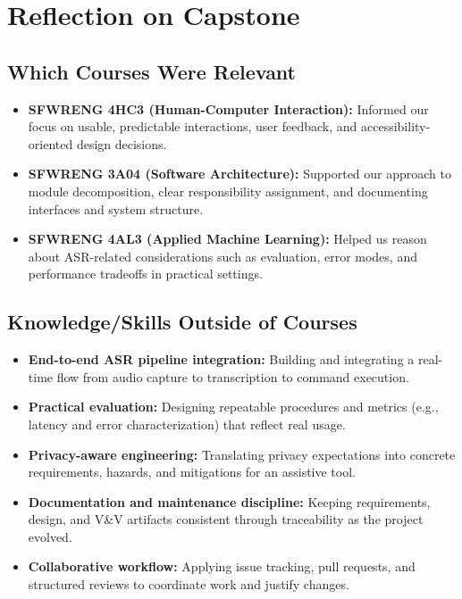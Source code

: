 \documentclass{article}
\begin{document}
\section{Reflection on Capstone}

\subsection{Which Courses Were Relevant}

\begin{itemize}
  \item \textbf{SFWRENG 4HC3 (Human-Computer Interaction):} Informed our focus on
  usable, predictable interactions, user feedback, and accessibility-oriented
  design decisions.
  \item \textbf{SFWRENG 3A04 (Software Architecture):} Supported our approach to
  module decomposition, clear responsibility assignment, and documenting
  interfaces and system structure.
  \item \textbf{SFWRENG 4AL3 (Applied Machine Learning):} Helped us reason about
  ASR-related considerations such as evaluation, error modes, and performance
  tradeoffs in practical settings.
\end{itemize}

\subsection{Knowledge/Skills Outside of Courses}

\begin{itemize}
  \item \textbf{End-to-end ASR pipeline integration:} Building and integrating a
  real-time flow from audio capture to transcription to command execution.
  \item \textbf{Practical evaluation:} Designing repeatable procedures and
  metrics (e.g., latency and error characterization) that reflect real usage.
  \item \textbf{Privacy-aware engineering:} Translating privacy expectations into
  concrete requirements, hazards, and mitigations for an assistive tool.
  \item \textbf{Documentation and maintenance discipline:} Keeping requirements,
  design, and V\&V artifacts consistent through traceability as the project
  evolved.
  \item \textbf{Collaborative workflow:} Applying issue tracking, pull requests,
  and structured reviews to coordinate work and justify changes.
\end{itemize}
\end{document}
